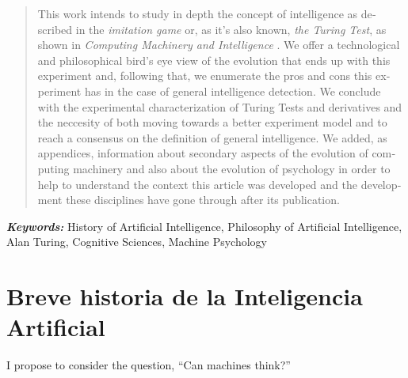 \documentclass[12pt]{memoir}
\providecommand{\keywords}[2]{
	\textbf{\textit{#1: }} #2
}
\begin{document}
\begin{otherlanguage}{english}
\begin{abstract}
    This work intends to study in depth the concept of intelligence as described in the \textit{imitation game} or, as it's also known, \textit{the Turing Test}, as shown in \textit{Computing Machinery and Intelligence} \parencite{Turing1950cmi}. We offer a technological and philosophical bird's eye view of the evolution that ends up with this experiment and, following that, we enumerate the pros and cons this experiment has in the case of general intelligence detection. We conclude with the experimental characterization of Turing Tests and derivatives and the neccesity of both moving towards a better experiment model and to reach a consensus on the definition of general intelligence. We added, as appendices, information about secondary aspects of the evolution of computing machinery and also about the evolution of psychology in order to help to understand the context this article was developed and the development these disciplines have gone through after its publication.
\end{abstract}
\end{otherlanguage}

\keywords{Keywords}{History of Artificial Intelligence, Philosophy of Artificial Intelligence, Alan Turing, Cognitive Sciences, Machine Psychology}

\newpage
\thispagestyle{empty}




\DoubleSpacing
\begin{KeepFromToc}
  \tableofcontents
\end{KeepFromToc}
\thispagestyle{empty}
\OnehalfSpacing
\newpage

\pagestyle{fancy}
\fancyhf{}
\cfoot{\thepage}

\chapter{Breve historia de la Inteligencia Artificial}

\epigraph{\flqq I propose to consider the question, ``Can machines think?''\frqq}{\cite{Turing1950cmi}}
\end{document}
